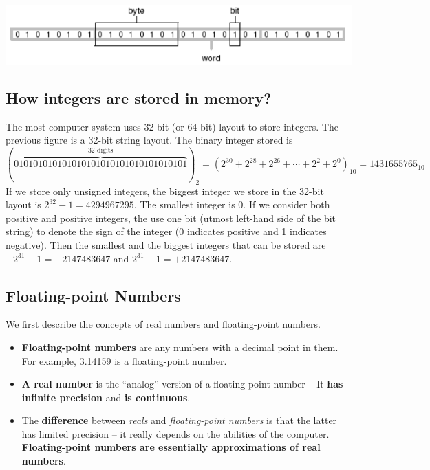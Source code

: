 \documentclass[
]{book}
\begin{document}
\begin{center}\includegraphics[width=0.85\linewidth]{img02/w02-ExampleMemoryUnit} \end{center}

\hypertarget{how-integers-are-stored-in-memory}{%
\subsection{How integers are stored in memory?}\label{how-integers-are-stored-in-memory}}

The most computer system uses 32-bit (or 64-bit) layout to store integers. The previous figure is a 32-bit string layout. The binary integer stored is \[
(\overbrace{010101010101010101010101010101010101}^\text{32 digits})_2 = (2^{30}+2^{28}+2^{26} + \cdots + 2^2 + 2^0)_{10} = 1431655765_{10}
\] If we store only unsigned integers, the biggest integer we store in the 32-bit layout is \(2^{32} - 1 = 4294967295\). The smallest integer is 0. If we consider both positive and positive integers, the use one bit (utmost left-hand side of the bit string) to denote the sign of the integer (0 indicates positive and 1 indicates negative). Then the smallest and the biggest integers that can be stored are \(-2^{31} -1 = - 2147483647\) and \(2^{31} -1 = + 2147483647\).

\hfill\break

\hypertarget{floating-point-numbers}{%
\subsection{Floating-point Numbers}\label{floating-point-numbers}}

We first describe the concepts of real numbers and floating-point numbers.

\begin{itemize}
\item
  \textbf{Floating-point numbers} are any numbers with a decimal point in them. For example, 3.14159 is a floating-point number.
\item
  \textbf{A real number} is the ``analog'' version of a floating-point number -- It \textbf{has infinite precision} and \textbf{is continuous}.
\item
  The \textbf{difference} between \emph{reals} and \emph{floating-point numbers} is that the latter has limited precision -- it really depends on the abilities of the computer. \textbf{Floating-point numbers are essentially approximations of real numbers}.
\end{itemize}
\end{document}
